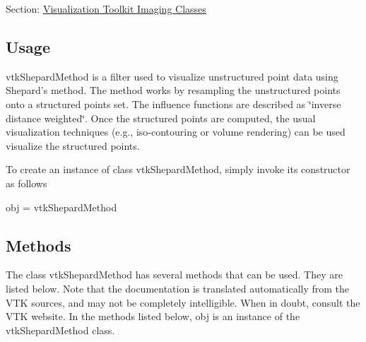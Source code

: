 Section\-: \hyperlink{sec_vtkimaging}{Visualization Toolkit Imaging Classes} \hypertarget{vtkwidgets_vtkxyplotwidget_Usage}{}\subsection{Usage}\label{vtkwidgets_vtkxyplotwidget_Usage}
vtk\-Shepard\-Method is a filter used to visualize unstructured point data using Shepard's method. The method works by resampling the unstructured points onto a structured points set. The influence functions are described as \char`\"{}inverse distance weighted\char`\"{}. Once the structured points are computed, the usual visualization techniques (e.\-g., iso-\/contouring or volume rendering) can be used visualize the structured points.

To create an instance of class vtk\-Shepard\-Method, simply invoke its constructor as follows \begin{DoxyVerb}  obj = vtkShepardMethod
\end{DoxyVerb}
 \hypertarget{vtkwidgets_vtkxyplotwidget_Methods}{}\subsection{Methods}\label{vtkwidgets_vtkxyplotwidget_Methods}
The class vtk\-Shepard\-Method has several methods that can be used. They are listed below. Note that the documentation is translated automatically from the V\-T\-K sources, and may not be completely intelligible. When in doubt, consult the V\-T\-K website. In the methods listed below, {\ttfamily obj} is an instance of the vtk\-Shepard\-Method class. 
